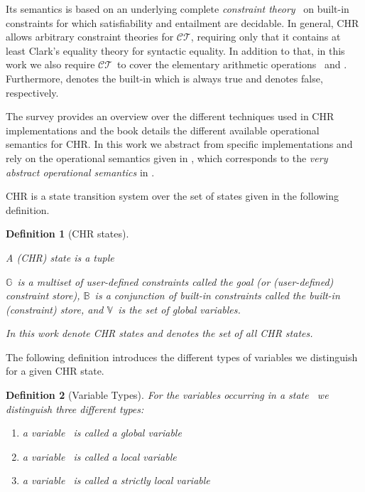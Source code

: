 \documentclass{tlp}
\newtheorem{definition}{Definition}[section]
\newcommand{\CT}{\ensuremath{\mathcal{CT}}}
\newcommand{\bbB}{\ensuremath{\mathbb{B}}}
\newcommand{\bbG}{\ensuremath{\mathbb{G}}}
\newcommand{\bbV}{\ensuremath{\mathbb{V}}}
\begin{document}
Its semantics is based on an underlying complete \emph{constraint theory}~
on built-in constraints for which satisfiability and entailment are decidable. In
general, CHR allows arbitrary constraint theories for \CT, requiring only that it
contains at least Clark's equality theory for syntactic equality. In addition to
that, in this work we also require \CT\ to cover the elementary arithmetic
operations~ and . Furthermore,  denotes the built-in which is
always true and  denotes false, respectively.

The survey \cite{chr_survey_tplp08} provides an overview over the different
techniques used in CHR implementations and the book \cite{fruehwirth09} details
the different available operational semantics for CHR. In this work we abstract
from specific implementations and rely on the operational semantics given in
\cite{Raiser2009a}, which corresponds to the \emph{very abstract operational
semantics} in \cite{fruehwirth09}.

CHR is a state transition system over the set of states given in the following
definition.

\begin{definition}[CHR states] 
\label{def:states}

A \emph{(CHR) state} is a tuple 

\bbG\ is a multiset of user-defined constraints called the \emph{goal} (or
\emph{(user-defined) constraint store}), \bbB\ is a conjunction of built-in
constraints called the \emph{built-in (constraint) store}, and \bbV\ is the set
of \emph{global variables}.

In this work  denote CHR states and  denotes the
set of all CHR states.
\end{definition}

The following definition introduces the different types of variables we
distinguish for a given CHR state.

\begin{definition}[Variable Types]\label{def:var_types} For the variables
occurring in a state~ we distinguish three
different types:
\begin{enumerate}
  \item a variable~ is called a \emph{global} variable
  \item a variable~ is called a \emph{local} variable
  \item a variable~ is called a
  \emph{strictly local} variable
\end{enumerate}
\end{definition}
\end{document}
